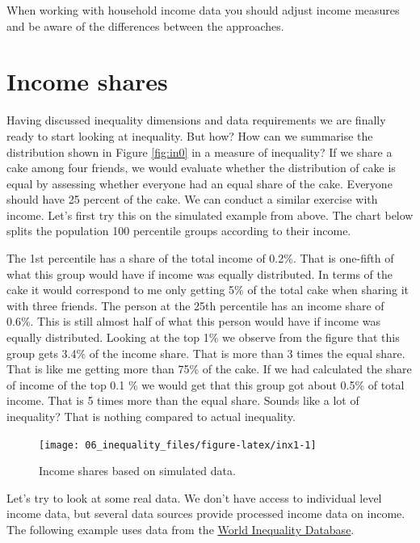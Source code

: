 \documentclass[
]{book}
\begin{document}
When working with household income data you should adjust income measures and be aware of the differences between the approaches.

\hypertarget{income-shares}{%
\section{Income shares}\label{income-shares}}

Having discussed inequality dimensions and data requirements we are finally ready to start looking at inequality. But how? How can we summarise the distribution shown in Figure \ref{fig:in0} in a measure of inequality? If we share a cake among four friends, we would evaluate whether the distribution of cake is equal by assessing whether everyone had an equal share of the cake. Everyone should have 25 percent of the cake. We can conduct a similar exercise with income. Let's first try this on the simulated example from above. The chart below splits the population 100 percentile groups according to their income.

The 1st percentile has a share of the total income of 0.2\%. That is one-fifth of what this group would have if income was equally distributed. In terms of the cake it would correspond to me only getting 5\% of the total cake when sharing it with three friends.
The person at the 25th percentile has an income share of 0.6\%. This is still almost half of what this person would have if income was equally distributed. Looking at the top 1\% we observe from the figure that this group gets 3.4\% of the income share. That is more than 3 times the equal share. That is like me getting more than 75\% of the cake. If we had calculated the share of income of the top 0.1 \% we would get that this group got about 0.5\% of total income. That is 5 times more than the equal share. Sounds like a lot of inequality? That is nothing compared to actual inequality.

\begin{figure}

{\centering \texttt{[image: 06\_inequality\_files/figure-latex/inx1-1]} 

}

\caption{\label{fig:figx} Income shares based on simulated data.}\label{fig:inx1}
\end{figure}

Let's try to look at some real data. We don't have access to individual level income data, but several data sources provide processed income data on income. The following example uses data from the \href{https://wid.world/data/}{World Inequality Database}.
\end{document}

